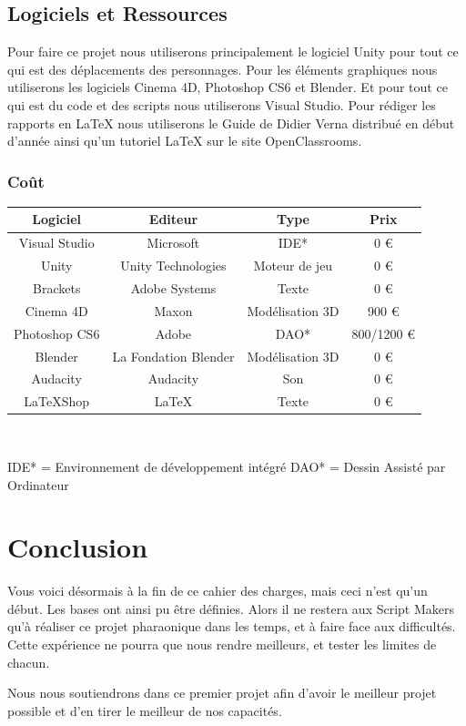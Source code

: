\documentclass[A4paper,11pt]{article}
\begin{document}
\subsection{Logiciels et Ressources}
Pour faire ce projet nous utiliserons principalement le logiciel Unity pour tout ce qui est des d\'eplacements des personnages. Pour les \'el\'ements graphiques nous utiliserons les logiciels Cinema 4D, Photoshop CS6 et Blender. Et pour tout ce qui est du code et des scripts nous utiliserons Visual Studio.
Pour r\'ediger les rapports en LaTeX nous utiliserons le Guide de Didier Verna distribu\'e en d\'ebut d'ann\'ee ainsi qu'un tutoriel LaTeX sur le site OpenClassrooms.

\subsubsection{Co\^ut}
\begin{center}
\begin{tabular}{|c|c|c|c|}
\hline
Logiciel & Editeur & Type & Prix\\
\hline
Visual Studio & Microsoft & IDE* & 0 \euro\\
\hline
Unity & Unity Technologies & Moteur de jeu & 0 \euro\\
\hline
Brackets & Adobe Systems & Texte & 0 \euro\\
\hline
Cinema 4D & Maxon & Mod\'elisation 3D & 900 \euro\\
\hline
Photoshop CS6 & Adobe &  DAO* & 800/1200 \euro\\
\hline
Blender & La Fondation Blender & Mod\'elisation 3D & 0 \euro\\
\hline
Audacity & Audacity & Son & 0 \euro\\
\hline
LaTeXShop & LaTeX & Texte & 0 \euro\\
\hline
\end{tabular}\\
\end{center}
IDE* = Environnement de d\'eveloppement int\'egr\'e
DAO* = Dessin Assist\'e par Ordinateur

\section{Conclusion}
Vous voici d\'esormais \`a la fin de ce cahier des charges, mais ceci n'est qu'un d\'ebut. Les bases ont ainsi pu \^etre d\'efinies. Alors il ne restera aux Script Makers qu'\`a r\'ealiser ce projet pharaonique dans les temps, et \`a faire face aux difficult\'es. Cette exp\'erience ne pourra que nous rendre meilleurs, et tester les limites de chacun.

Nous nous soutiendrons dans ce premier projet afin d'avoir le meilleur projet possible et d'en tirer le meilleur de nos capacit\'es. 
\end{document}
